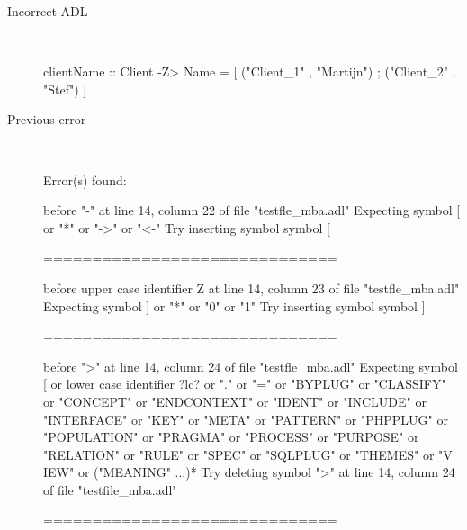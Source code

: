 \begin{description}
  \item[Incorrect ADL]~\\
\begin{adl}
clientName :: Client -Z> Name =
    [ ("Client_1"      , "Martijn")
    ; ("Client_2"      , "Stef")
    ]
\end{adl}
  \item[Previous error]~\\
\begin{haskell}
Error(s) found:

before "-" at line 14, column 22 of file "testfle_mba.adl"
Expecting symbol [ or "*" or "->" or "<-"
Try inserting symbol symbol [

==============================

before upper case identifier Z at line 14, column 23 of file "testfle_mba.adl"
Expecting symbol ] or "*" or "0" or "1"
Try inserting symbol symbol ]

==============================

before ">" at line 14, column 24 of file "testfle_mba.adl"
Expecting symbol [ or lower case identifier ?lc? or "." or "=" or "BYPLUG" or "CLASSIFY" or "CONCEPT" or "ENDCONTEXT" or "IDENT" or "INCLUDE" or "INTERFACE" or
"KEY" or "META" or "PATTERN" or "PHPPLUG" or "POPULATION" or "PRAGMA" or "PROCESS" or "PURPOSE" or "RELATION" or "RULE" or "SPEC" or "SQLPLUG" or "THEMES" or "V
IEW" or ("MEANING" ...)*
Try deleting symbol ">" at line 14, column 24 of file "testfile_mba.adl"

==============================


\end{haskell}
\end{description}
